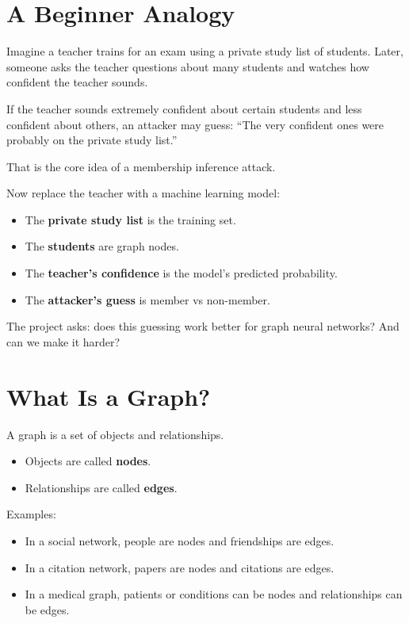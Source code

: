 \documentclass[11pt,a4paper]{article}
\begin{document}
\section{A Beginner Analogy}

Imagine a teacher trains for an exam using a private study list of students. Later, someone asks the teacher questions about many students and watches how confident the teacher sounds.

If the teacher sounds extremely confident about certain students and less confident about others, an attacker may guess: ``The very confident ones were probably on the private study list.''

That is the core idea of a membership inference attack.

Now replace the teacher with a machine learning model:

\begin{itemize}
  \item The \textbf{private study list} is the training set.
  \item The \textbf{students} are graph nodes.
  \item The \textbf{teacher's confidence} is the model's predicted probability.
  \item The \textbf{attacker's guess} is member vs non-member.
\end{itemize}

The project asks: does this guessing work better for graph neural networks? And can we make it harder?

\section{What Is a Graph?}

A graph is a set of objects and relationships.

\begin{itemize}
  \item Objects are called \textbf{nodes}.
  \item Relationships are called \textbf{edges}.
\end{itemize}

Examples:
\begin{itemize}
  \item In a social network, people are nodes and friendships are edges.
  \item In a citation network, papers are nodes and citations are edges.
  \item In a medical graph, patients or conditions can be nodes and relationships can be edges.
\end{itemize}
\end{document}

